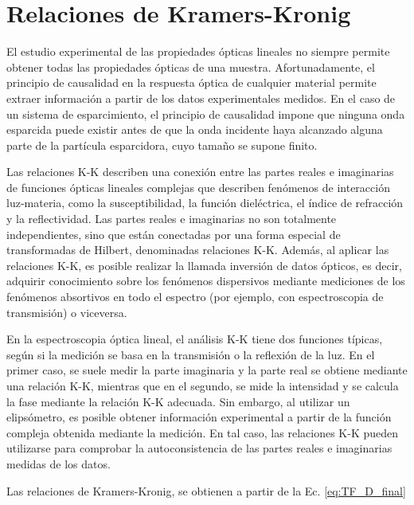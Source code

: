

\section{Relaciones de Kramers-Kronig}
\label{section:yth}

El estudio experimental de las propiedades ópticas lineales no siempre permite obtener todas las propiedades ópticas de una muestra. Afortunadamente, el principio de causalidad en la respuesta óptica de cualquier material permite extraer información a partir de los datos experimentales medidos. En el caso de un sistema de esparcimiento, el principio de causalidad impone que ninguna onda esparcida puede existir antes de que la onda incidente haya alcanzado alguna parte de la partícula esparcidora, cuyo tamaño se supone finito.

Las relaciones K-K describen una conexión entre las partes reales e imaginarias de funciones ópticas lineales complejas que describen fenómenos de interacción luz-materia, como la susceptibilidad, la función dieléctrica, el índice de refracción y la reflectividad. Las partes reales e imaginarias no son totalmente independientes, sino que están conectadas por una forma especial de transformadas de Hilbert, denominadas relaciones K-K.  Además, al aplicar las relaciones K-K, es posible realizar la llamada inversión de datos ópticos, es decir, adquirir conocimiento sobre los fenómenos dispersivos mediante mediciones de los fenómenos absortivos en todo el espectro (por ejemplo, con espectroscopia de transmisión) o viceversa. 

En la espectroscopia óptica lineal, el análisis K-K tiene dos funciones típicas, según si la medición se basa en la transmisión o la reflexión de la luz. En el primer caso, se suele medir la parte imaginaria y la parte real se obtiene mediante una relación K-K, mientras que en el segundo, se mide la intensidad y se calcula la fase mediante la relación K-K adecuada.
Sin embargo, al utilizar un elipsómetro, es posible obtener información experimental a partir de la función compleja obtenida mediante la medición. En tal caso, las relaciones K-K pueden utilizarse para comprobar la autoconsistencia de las partes reales e imaginarias medidas de los datos.

Las relaciones de Kramers-Kronig, se obtienen a partir de la Ec. \eqref{eq:TF_D_final} 

